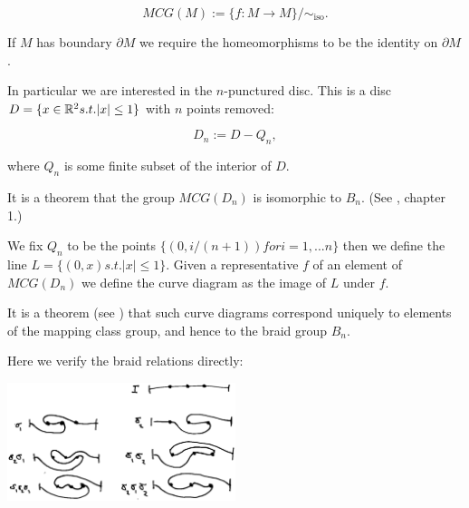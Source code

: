 \documentclass[12pt,a4paper]{article}
\begin{document}
    $$ MCG(M) := \{ f : M \to M \} / \sim_{\text{iso}}.$$

If $M$ has boundary $\partial M$ we require the homeomorphisms to
be the identity on $\partial M$.

In particular we are interested in
 the $n$-punctured disc.
This is a disc $D = \{ x\in \mathbb{R}^2 s.t. |x|\leq 1 \} $
with $n$ points removed:

    $$ D_n := D - Q_n,$$

where $Q_n$ is some finite subset of the interior of $D$.


It is a theorem that the group $MCG(D_n)$ is isomorphic to $B_n.$
(See \cite{Kassel10}, chapter 1.)

We fix $Q_n$ to be the points $\{(0, i/(n+1)) for i=1,...n\}$
then we define the line $L = \{(0, x) s.t. |x|\leq 1\}.$
Given a representative $f$ of an element of $MCG(D_n)$
we define the
curve diagram as the
image of $L$ under $f$.

It is a theorem (see \cite{Dehornoy02}) that such curve diagrams
correspond uniquely to elements of the mapping class group, and
hence to the braid group $B_n$.

Here we verify the braid relations directly:

\begin{center}
\includegraphics[width=0.5\textwidth]{curve-braid.eps}
\end{center}










{}

\end{document}
